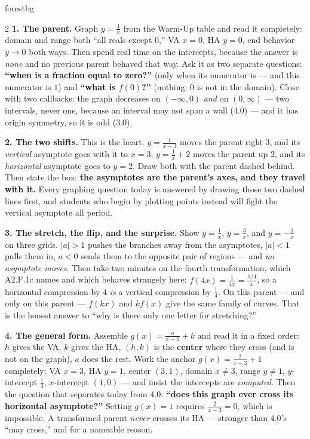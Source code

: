 \documentclass[10pt]{article}
\begin{document}
\begin{skillbox}[Lesson]{forestbg}
\begin{multicols}{2}
\textbf{1. The parent.} Graph $y=\frac1x$ from the Warm-Up table and read it completely: domain and
range both ``all reals except $0$,'' VA $x=0$, HA $y=0$, end behavior $y\to0$ both ways. Then spend real
time on the intercepts, because the answer is \emph{none} and no previous parent behaved that way. Ask
it as two separate questions: \textbf{``when is a fraction equal to zero?''} (only when its numerator
is --- and this numerator is $1$) and \textbf{``what is $f(0)$?''} (nothing; $0$ is not in the domain).
Close with two callbacks: the graph decreases on $(-\infty,0)$ \emph{and} on $(0,\infty)$ --- two
intervals, never one, because an interval may not span a wall (4.0) --- and it has origin symmetry, so
it is odd (3.0).

\textbf{2. The two shifts.} This is the heart. $y=\frac{1}{x-3}$ moves the parent right $3$, and its
\emph{vertical} asymptote goes with it to $x=3$; $y=\frac1x+2$ moves the parent up $2$, and its
\emph{horizontal} asymptote goes to $y=2$. Draw both with the parent dashed behind. Then state the box:
\textbf{the asymptotes are the parent's axes, and they travel with it.} Every graphing question today
is answered by drawing those two dashed lines first, and students who begin by plotting points instead
will fight the vertical asymptote all period.

\textbf{3. The stretch, the flip, and the surprise.} Show $y=\frac1x$, $y=\frac3x$, and $y=-\frac1x$ on
three grids. $|a|>1$ pushes the branches away from the asymptotes, $|a|<1$ pulls them in, $a<0$ sends
them to the opposite pair of regions --- and \emph{no asymptote moves}. Then take two minutes on the
fourth transformation, which A2.F.1c names and which behaves strangely here:
$f(4x)=\frac{1}{4x}=\frac{1/4}{x}$, so a horizontal compression by $4$ \emph{is} a vertical compression
by $\frac14$. On this parent --- and only on this parent --- $f(kx)$ and $kf(x)$ give the same family
of curves. That is the honest answer to ``why is there only one letter for stretching?''

\columnbreak

\textbf{4. The general form.} Assemble $g(x)=\frac{a}{x-h}+k$ and read it in a fixed order: $h$ gives
the VA, $k$ gives the HA, $(h,k)$ is the \textbf{center} where they cross (and is not on the graph),
$a$ does the rest. Work the anchor $g(x)=\frac{2}{x-3}+1$ completely: VA $x=3$, HA $y=1$, center
$(3,1)$, domain $x\neq3$, range $y\neq1$, $y$-intercept $\frac13$, $x$-intercept $(1,0)$ --- and insist
the intercepts are \emph{computed}. Then the question that separates today from 4.0: \textbf{``does
this graph ever cross its horizontal asymptote?''} Setting $g(x)=1$ requires $\frac{2}{x-3}=0$, which is
impossible. A transformed parent \emph{never} crosses its HA --- stronger than 4.0's ``may cross,'' and
for a nameable reason.


\end{multicols}
\end{skillbox}
\end{document}
